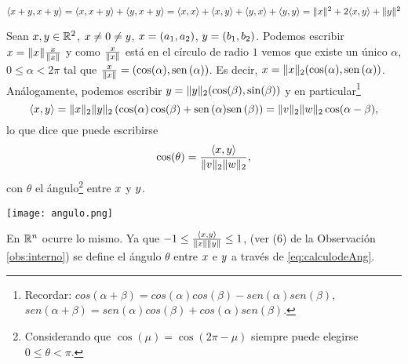 \begin{ejemplo}
$\langle \xb + \yb, \xb + \yb\rangle = \langle \xb, \xb + \yb\rangle + \langle \yb, \xb + \yb\rangle = \langle \xb, \xb \rangle + \langle \xb, \yb \rangle + \langle \yb, \xb \rangle + \langle \yb, \yb\rangle = \|\xb\|^2 + 2\langle \xb, \yb \rangle + \|\yb\|^2$
\end{ejemplo}
Sean $\xb,\yb\in \R^2$, $\xb\neq \cero\neq \yb$, $\xb=(a_1,a_2)$, $\yb=(b_1,b_2)$.   Podemos escribir $\xb=\|\xb\|\frac{\xb}{\|\xb\|}$ y como $ \frac{\xb}{\|\xb\|}$ está en el círculo de radio $1$ vemos que existe un único $\alpha$, $0\le \alpha<2\pi$ tal que
$ \frac{\xb}{\|\xb\|}=(\cos(\alpha),\sen(\alpha))$. Es decir, $\xb=\|\xb\|_2(\cos(\alpha),\sen(\alpha))$. Análogamente, podemos escribir $\yb=\|\yb\|_2(\cos(\beta),\sin(\beta))$ y en particular\footnote{Recordar: $
cos(\alpha +\beta)=cos(\alpha)cos(\beta)-sen(\alpha)sen(\beta),
$
$
sen(\alpha +\beta)=sen(\alpha)cos(\beta)+cos(\alpha)sen(\beta).
$
}
$$
\langle \xb,\yb\rangle= \|\xb\|_2\|\yb\|_2\left(\cos(\alpha)\cos(\beta)+\sen(\alpha)\sen(\beta)\right)=\|\vb\|_2\|\wb\|_2\cos(\alpha-\beta),
$$
lo que dice que puede escribirse
\begin{equation}
 \label{eq:calculodeAng}
\cos(\theta)=\frac{\langle \xb,\yb\rangle}{\|\vb\|_2\|\wb\|_2},
\end{equation}
con $\theta$ el ángulo\footnote{Considerando que $\cos(\mu)=\cos(2\pi-\mu)$ siempre puede elegirse $0\le \theta < \pi$.} entre $\xb$ y $\yb$.
\begin{center}
 \texttt{[image: angulo.png]}
\end{center}
En $\mathbb R^{n}$ ocurre lo mismo. Ya que $-1\le\frac{\langle \xb, \yb\rangle}{\|\xb\|\|\yb\|}\le 1$, (ver (6) de la Observación \ref{obs:interno}) se define el ángulo $\theta$ entre $\xb$ e $\yb$ a través de \eqref{eq:calculodeAng}.



